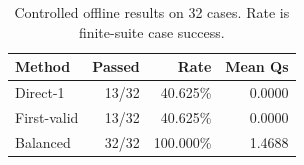 \begin{table}[t]
\centering
\caption{Controlled offline results on 32 cases. Rate is finite-suite case success.}
\label{tab:offline_results}
\footnotesize
\begin{tabularx}{\columnwidth}{@{}Xrrr@{}}
\toprule
Method & Passed & Rate & Mean Qs \\ \midrule
Direct-1 & 13/32 & 40.625\% & 0.0000 \\
First-valid & 13/32 & 40.625\% & 0.0000 \\
Balanced & 32/32 & 100.000\% & 1.4688 \\
\bottomrule
\end{tabularx}
\end{table}
